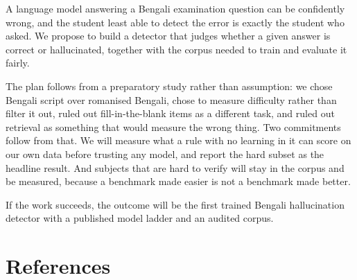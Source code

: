 \documentclass[12pt,a4paper]{article}
\begin{document}
A language model answering a Bengali examination question can be confidently
wrong, and the student least able to detect the error is exactly the student who
asked. We propose to build a detector that judges whether a given answer is
correct or hallucinated, together with the corpus needed to train and evaluate
it fairly.

The plan follows from a preparatory study rather than assumption: we chose
Bengali script over romanised Bengali, chose to measure difficulty rather than
filter it out, ruled out fill-in-the-blank items as a different task, and ruled
out retrieval as something that would measure the wrong thing. Two commitments
follow from that. We will measure what a rule with no learning in it can score
on our own data before trusting any model, and report the hard subset as the
headline result. And subjects that are hard to verify will stay in the corpus
and be measured, because a benchmark made easier is not a benchmark made better.

If the work succeeds, the outcome will be the first trained Bengali
hallucination detector with a published model ladder and an audited corpus.

\section*{References}
\end{document}
